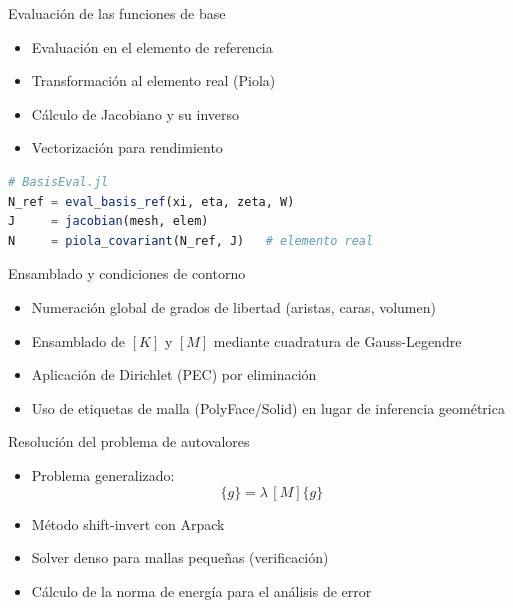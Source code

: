 \documentclass[aspectratio=169,11pt]{beamer}
\begin{document}
\begin{frame}[fragile]{Evaluación de las funciones de base}
  \begin{itemize}
    \item Evaluación en el elemento de referencia
    \item Transformación al elemento real (Piola)
    \item Cálculo de Jacobiano y su inverso
    \item Vectorización para rendimiento
  \end{itemize}

  \vspace{2mm}
  \begin{lstlisting}[language=Julia]
# BasisEval.jl
N_ref = eval_basis_ref(xi, eta, zeta, W)
J     = jacobian(mesh, elem)
N     = piola_covariant(N_ref, J)   # elemento real
  \end{lstlisting}
\end{frame}

\begin{frame}{Ensamblado y condiciones de contorno}
  \begin{itemize}
    \item Numeración global de grados de libertad (aristas, caras, volumen)
    \item Ensamblado de $[K]$ y $[M]$ mediante cuadratura de Gauss-Legendre
    \item Aplicación de Dirichlet (PEC) por eliminación
    \item Uso de etiquetas de malla (PolyFace/Solid) en lugar de inferencia
          geométrica
  \end{itemize}
\end{frame}

\begin{frame}{Resolución del problema de autovalores}
  \begin{itemize}
    \item Problema generalizado:
      \begin{equation*}
        [K]\{g\} = \lambda\, [M]\{g\}
      \end{equation*}
    \item Método shift-invert con Arpack
    \item Solver denso para mallas pequeñas (verificación)
    \item Cálculo de la norma de energía para el análisis de error
  \end{itemize}
\end{frame}
\end{document}
